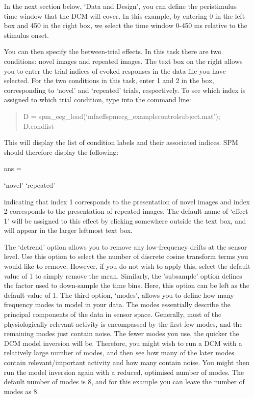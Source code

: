 In the next section below, `Data and Design', you can define the
peristimulus time window that the DCM will cover. In this example, by
entering 0 in the left box and 450 in the right box, we select the time
window 0-450 ms relative to the stimulus onset.

You can then specify the between-trial effects. In this task there are
two conditions: novel images and repeated images. The text box on the
right allows you to enter the trial indices of evoked responses in the
data file you have selected. For the two conditions in this task, enter
1 and 2 in the box, corresponding to `novel' and `repeated' trials,
respectively. To see which index is assigned to which trial condition,
type into the command line:

\begin{quote}
D = spm\_eeg\_load(`mfaeffspmeeg\_examplecontrolsubject.mat');\\
D.condlist
\end{quote}

This will display the list of condition labels and their associated
indices. SPM should therefore display the following:

ans =

`novel' `repeated'

indicating that index 1 corresponds to the presentation of novel images
and index 2 corresponds to the presentation of repeated images. The
default name of `effect 1' will be assigned to this effect by clicking
somewhere outside the text box, and will appear in the larger leftmost
text box.

The `detrend' option allows you to remove any low-frequency drifts at
the sensor level. Use this option to select the number of discrete
cosine transform terms you would like to remove. However, if you do not
wish to apply this, select the default value of 1 to simply remove the
mean. Similarly, the 'subsample' option defines the factor used to
down-sample the time bins. Here, this option can be left as the default
value of 1. The third option, `modes', allows you to define how many
frequency modes to model in your data. The modes essentially describe
the principal components of the data in sensor space. Generally, most of
the physiologically relevant activity is encompassed by the first few
modes, and the remaining modes just contain noise. The fewer modes you
use, the quicker the DCM model inversion will be. Therefore, you might
wish to run a DCM with a relatively large number of modes, and then see
how many of the later modes contain relevant/important activity and how
many contain noise. You might then run the model inversion again with a
reduced, optimised number of modes. The default number of modes is 8,
and for this example you can leave the number of modes as 8.

